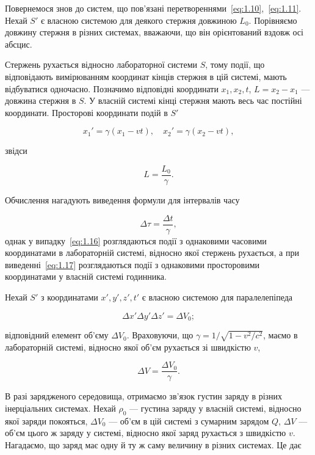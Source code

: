 Повернемося знов до систем, що пов’язані перетвореннями~\eqref{eq:1.10},~\eqref{eq:1.11}. Нехай $S'$ є власною системою для деякого стержня довжиною $L_0$. Порівняємо довжину стержня в різних системах, вважаючи, що він орієнтований вздовж осі абсцис.

Стержень рухається відносно лабораторної системи $S$, тому події, що відповідають вимірюванням координат кінців стержня в цій системі, мають відбуватися одночасно. Позначимо відповідні координати $x_1, x_2, t$, $L = x_2 - x_1$ --- довжина стержня в $S$. У власній системі кінці стержня мають весь час постійні координати. Просторові координати подій в $S'$

\[
x_1' = \gamma (x_1 - v t), \quad x_2' = \gamma (x_2 - v t),
\]

звідси

\begin{equation}
L = \frac{L_0}{\gamma}.
\label{eq:1.16}
\end{equation}

Обчислення нагадують виведення формули для інтервалів часу

\begin{equation}
\Delta \tau = \frac{\Delta t}{\gamma},
\label{eq:1.17}
\end{equation}
%
однак у випадку~\eqref{eq:1.16} розглядаються події з однаковими часовими координатами в лабораторній системі, відносно якої стержень рухається, а при виведенні~\eqref{eq:1.17} розглядаються події з однаковими просторовими координатами у власній системі годинника.

Нехай $S'$ з координатами $x',y',z',t'$ є власною системою для паралелепіпеда

\[
\Delta x' \Delta y' \Delta z' = \Delta V_0;
\]

відповідний елемент об’єму $\Delta V_0$. Враховуючи, що $\gamma = 1/\sqrt{1 - v^2/c^2}$, маємо в лабораторній системі, відносно якої об'єм рухається зі швидкістю $v$,

\begin{equation}
\Delta V = \frac{\Delta V_0}{\gamma}.
\label{eq:1.18}
\end{equation}

В разі зарядженого середовища, отримаємо зв'язок густин заряду в різних інерціальних системах. Нехай $\rho_0$ --- густина заряду у власній системі, відносно якої заряди покояться, $\Delta V_0$ --- об’єм в цій системі з сумарним зарядом $Q$, $\Delta V$ --- об’єм цього ж заряду у системі, відносно якої заряд рухається з швидкістю $v$. Нагадаємо, що заряд має одну й ту ж саму величину в різних системах. Це дає

